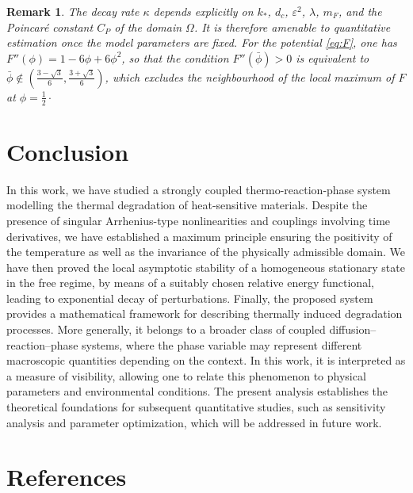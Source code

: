 \documentclass[final,1p,times]{elsarticle}
\numberwithin{equation}{section}
\newtheorem{remark}[theorem]{Remark}
\begin{document}
	\begin{remark}
		The decay rate $\kappa$ depends explicitly on $k_*$, $d_c$, $\varepsilon^2$,
		$\lambda$, $m_F$, and the Poincaré constant $C_P$ of the domain $\Omega$. It is therefore
		amenable to quantitative estimation once the model parameters are fixed. For the
		potential \eqref{eq:F}, one has $F''(\phi) = 1 - 6\phi + 6\phi^2$, so that the condition
		$F''(\bar\phi) > 0$ is equivalent to $\bar\phi \notin \left(\frac{3-\sqrt{3}}{6},\frac{3+\sqrt{3}}{6}\right)$,
		which excludes the neighbourhood of the local maximum of $F$ at $\phi = \tfrac{1}{2}\cdotp$
	\end{remark}
	
	\section{Conclusion}
	In this work, we have studied a strongly coupled thermo-reaction-phase system modelling the thermal degradation of heat-sensitive materials. Despite the presence of singular Arrhenius-type nonlinearities and couplings involving time derivatives, we have established a maximum principle ensuring the positivity of the temperature as well as the invariance of the physically admissible domain. We have then proved the local asymptotic stability of a homogeneous stationary state in the free regime, by means of a suitably chosen relative energy functional, leading to exponential decay of perturbations. Finally, the proposed system provides a mathematical framework for describing thermally induced degradation processes. More generally, it belongs to a broader class of coupled diffusion--reaction--phase systems, where the phase variable may represent different macroscopic quantities depending on the context. In this work, it is interpreted as a measure of visibility, allowing one to relate this phenomenon to physical parameters and environmental conditions. The present analysis establishes the theoretical foundations for subsequent quantitative studies, such as sensitivity analysis and parameter optimization, which will be addressed in future work.
	

	
	\section*{References}
	
\end{document}
